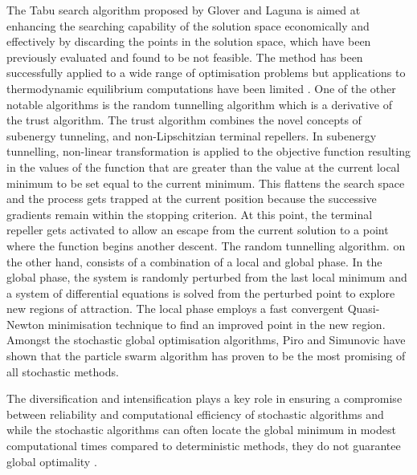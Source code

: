 	The Tabu search algorithm proposed by Glover and Laguna \cite{Glover:1993aa} is aimed at enhancing the searching capability of the solution space economically and effectively by discarding the points in the solution space, which have been previously evaluated and found to be not feasible. The method has been successfully applied to a wide range of optimisation problems but  applications to thermodynamic equilibrium computations have been limited \cite{SRINIVAS2007760,Teh03}. One of the other notable algorithms is the random tunnelling algorithm which is a derivative of the \gls{trust} algorithm. The \gls{trust} algorithm \cite{Barhen97} combines the novel concepts of subenergy tunneling, and non-Lipschitzian terminal repellers. In subenergy tunnelling, non-linear transformation is applied to the objective function resulting in the values of the function that are greater than the value at the current local minimum to be set equal to the current minimum. This flattens the search space and the process gets trapped at the current position because the successive gradients remain within the stopping criterion. At this point, the terminal repeller gets activated to allow an escape from the current solution to a point where the function begins another descent. The random tunnelling algorithm. on the other hand, consists of a combination of a local and global phase. In the global phase, the system is randomly perturbed from the last local minimum and a system of differential equations is solved from the perturbed point to explore new regions of attraction. The local phase employs a fast convergent Quasi-Newton minimisation technique to find an improved point in the new region. Amongst the stochastic global optimisation algorithms, Piro and Simunovic \cite{Piro16} have shown that the particle swarm algorithm has proven to be the most promising of all stochastic methods.

	The diversification and intensification plays a key role in ensuring a compromise between reliability and computational efficiency of stochastic algorithms and while the stochastic algorithms can often locate the global minimum in modest computational times compared to deterministic methods, they do not guarantee global optimality \cite{Zhang11,Blum:2003aa}.


